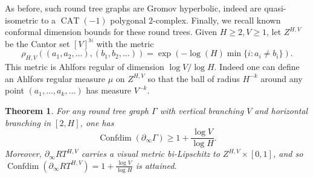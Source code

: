 \documentclass[11pt]{amsart}
\numberwithin{equation}{section}
\newtheorem{theorem}[equation]{Theorem}
\theoremstyle{citing}
\DeclareMathOperator{\CAT}{CAT}
\DeclareMathOperator{\Confdim}{Confdim}
\newcommand{\bdry}{\partial_\infty}
\newcommand{\N}{\mathbb{N}}
\numberwithin{equation}{section}
\begin{document}
As before, such round tree graphs are Gromov hyperbolic, indeed are quasi-isometric to a $\CAT(-1)$ polygonal $2$-complex.  Finally, we recall known conformal dimension bounds for these round trees.
Given $H \geq 2, V \geq 1$, let $Z^{H,V}$ be the Cantor set $[V]^\N$ with the metric 
\[
	\rho_{H,V}((a_1,a_2,\ldots),(b_1,b_2,\ldots)) = \exp\left(-\log(H)\min\{i : a_i \neq b_i\}\right).
\]
This metric is Ahlfors regular of dimension $\log V / \log H$.
Indeed one can define an Ahlfors regular measure $\mu$ on $Z^{H,V}$ so that the ball of radius $H^{-k}$ around any point $(a_1,\ldots,a_k,\ldots)$ has measure $V^{-k}$.
\begin{theorem}
	\label{thm:round-tree-confdim}
	For any round tree graph $\Gamma$ with vertical branching $V$ and horizontal branching in $[2,H]$, one has
	\[
		\Confdim(\bdry \Gamma) \geq 1+\frac{\log V}{\log H}.
	\]
	Moreover, $\bdry RT^{H,V}$ carries a visual metric bi-Lipschitz to $Z^{H,V} \times[0,1]$, and so $\Confdim(\bdry RT^{H,V})= 1+\frac{\log V}{\log H}$ is attained.
\end{theorem}
\end{document}
